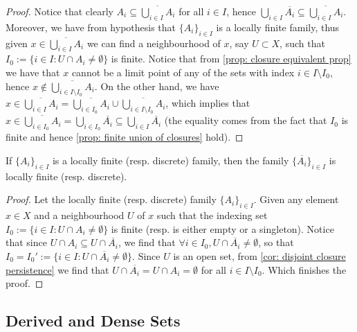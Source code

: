 \begin{proof}
Notice that clearly \(A_i \subseteq \overline{\bigcup_{i \in  I} A_i}\) for
all \(i \in I\), hence \(\bigcup_{i \in  I} \overline{A_i} \subseteq
\overline{\bigcup_{i \in I} A_i}\). Moreover, we have from hypothesis that
\(\{A_i\}_{i \in I}\) is a locally finite family, thus given \(x \in
\overline{\bigcup_{i \in  I} A_i}\) we can find a neighbourhood of \(x\), say
\(U \subset X\), such that \(I_0 := \{i \in I : U \cap A_i \neq \emptyset\}\)
is finite. Notice that from \cref{prop: closure equivalent prop} we have that
\(x\) cannot be a limit point of any of the sets with index \(i \in I
\setminus I_0\), hence \(x \not\in \overline{\bigcup_{i \in  I \setminus I_0}
A_i}\). On the other hand, we have \(x \in \overline{\bigcup_{i \in  I} A_i} =
\overline{\bigcup_{i \in  I_0} A_i} \cup \overline{\bigcup_{i \in  I \setminus
I_0} A_i}\), which implies that \(x \in \overline{\bigcup_{i \in  I_0} A_i} =
\bigcup_{i \in  I_0} \overline{A_i} \subseteq \bigcup_{i \in  I}
\overline{A_i}\) (the equality comes from the fact that \(I_0\) is finite and
hence \cref{prop: finite union of closures} hold).
\end{proof}

\begin{proposition}
If \(\{A_i\}_{i \in I}\) is a locally finite (resp. discrete) family, then the
family \(\{\overline{A_i}\}_{i \in I}\) is locally finite (resp. discrete).
\end{proposition}

\begin{proof}
Let the locally finite (resp. discrete) family \(\{A_i\}_{i \in I}\). Given
any element \(x \in X\) and a neighbourhood \(U\) of \(x\) such that the
indexing set \(I_0 := \{i \in I: U \cap A_i \neq \emptyset\}\) is finite
(resp. is either empty or a singleton). Notice that since \(U \cap A_i
\subseteq U \cap \overline{A_i}\), we find that \(\forall i \in I_0, U \cap
\overline{A_i} \neq \emptyset\), so that \(I_0 = I_0' := \{i \in I: U \cap
\overline{A_i} \neq \emptyset\}\). Since \(U\) is an open set, from \cref{cor:
disjoint closure persistence} we find that \(U \cap \overline{A_i} = U \cap
A_i = \emptyset\) for all \(i \in I \setminus I_0\). Which finishes the proof.
\end{proof}

\subsection{Derived and Dense Sets}

